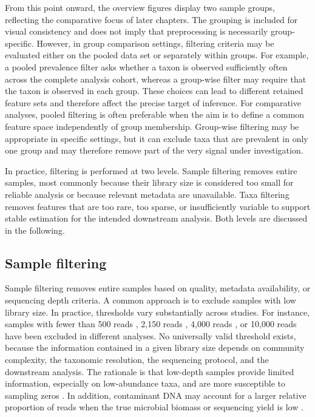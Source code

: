 From this point onward, the overview figures display two sample groups, reflecting the comparative focus of later chapters. The grouping is included for visual consistency and does not imply that preprocessing is necessarily group-specific. However, in group comparison settings, filtering criteria may be evaluated either on the pooled data set or separately within groups. For example, a pooled prevalence filter asks whether a taxon is observed sufficiently often across the complete analysis cohort, whereas a group-wise filter may require that the taxon is observed in each group. These choices can lead to different retained feature sets and therefore affect the precise target of inference. For comparative analyses, pooled filtering is often preferable when the aim is to define a common feature space independently of group membership. Group-wise filtering may be appropriate in specific settings, but it can exclude taxa that are prevalent in only one group and may therefore remove part of the very signal under investigation.

In practice, filtering is performed at two levels. Sample filtering removes entire samples, most commonly because their library size is considered too small for reliable analysis or because relevant metadata are unavailable. Taxa filtering removes features that are too rare, too sparse, or insufficiently variable to support stable estimation for the intended downstream analysis. Both levels are discussed in the following.

\subsection{Sample filtering}
\label{sec:2micro:filtering:samples}

Sample filtering removes entire samples based on quality, metadata availability, or sequencing depth criteria. A common approach is to exclude samples with low library size. In practice, thresholds vary substantially across studies. For instance, samples with fewer than 500 reads \citep{carcy2024metaibs}, 2,150 reads \citep{kirjavainen2019farmlike}, 4,000 reads \citep{kennedy2014evaluating}, or 10,000 reads \citep{parada2016every} have been excluded in different analyses.
No universally valid threshold exists, because the information contained in a given library size depends on community complexity, the taxonomic resolution, the sequencing protocol, and the downstream analysis.
The rationale is that low-depth samples provide limited information, especially on low-abundance taxa, and are more susceptible to sampling zeros \citep{martin2011dealing}. In addition, contaminant DNA may account for a larger relative proportion of reads when the true microbial biomass or sequencing yield is low \citep{salter2014reagent}.

